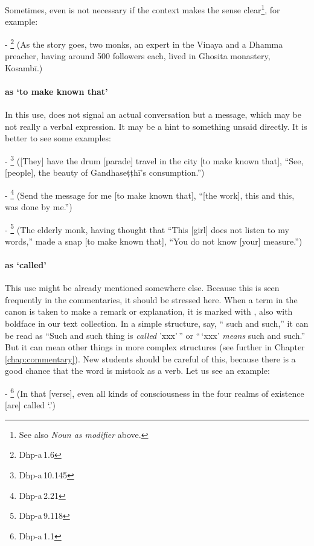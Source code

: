 \medskip
Sometimes, even  is not necessary if the context makes the sense clear\footnote{See also \emph{Noun as modifier} above.}, for example:\par
- \footnote{Dhp-a\,1.6} (As the story goes, two monks, an expert in the Vinaya and a Dhamma preacher, having around 500 followers each, lived in Ghosita mona\-stery, Kosamb\=i.)\par

\paragraph*{ as `to make known that'} In this use,  does not signal an actual conversation but a message, which may be not really a verbal expression. It may be a hint to something unsaid directly. It is better to see some examples:\par
- \footnote{Dhp-a\,10.145} ([They] have the drum [parade] travel in the city [to make known that], ``See, [people], the beauty of Gandhase\d t\d th\=i's consumption.'')\par
- \footnote{Dhp-a\,2.21} (Send the message for me [to make known that], ``[the work], this and this, was done by me.'')\par
- \footnote{Dhp-a\,9.118} (The elderly monk, having thought that ``This [girl] does not listen to my words,'' made a snap [to make known that], ``You do not know [your] measure.'')\par

\paragraph*{ as `called'} This use might be already mentioned somewhere else. Because this is seen frequently in the commentaries, it should be stressed here. When a term in the canon is taken to make a remark or explanation, it is marked with , also with boldface in our text collection. In a simple structure, say, `` such and such,'' it can be read as ``Such and such thing is \emph{called} 'xxx'\,'' or ``\,`xxx' \emph{means} such and such.'' But it can mean other things in more complex structures (see further in Chapter \ref{chap:commentary}). New students should be careful of this, because there is a good chance that the word is mistook as a verb. Let us see an example:\par
- \footnote{Dhp-a\,1.1} (In that [verse], even all kinds of consciousness in the four realms of existence [are] called `.')\par

